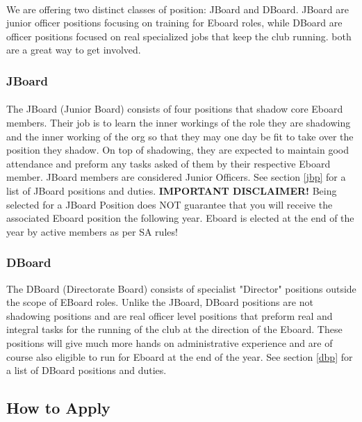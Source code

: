 \documentclass{article}
\begin{document}
\paragraph{}
We are offering two distinct classes of position: JBoard and DBoard. JBoard are junior officer positions focusing on training for Eboard roles, while DBoard are officer positions focused on real specialized jobs that keep the club running. both are a great way to get involved.  
\subsubsection{JBoard}\label{jbd}
\paragraph{}
The JBoard (Junior Board) consists of four positions that shadow core Eboard members. Their job is to learn the inner workings of the role they are shadowing and the inner working of the org so that they may one day be fit to take over the position they shadow. On top of shadowing, they are expected to maintain good attendance and preform any tasks asked of them by their respective Eboard member. JBoard members are considered Junior Officers. See section \ref{jbp} for a list of JBoard positions and duties.
\newline\newline 
\textbf{IMPORTANT DISCLAIMER!} Being selected for a JBoard Position does NOT guarantee that you will receive the associated Eboard position the following year. Eboard is elected at the end of the year by active members as per SA rules!

\subsubsection{DBoard}
The DBoard (Directorate Board) consists of specialist "Director" positions outside the scope of EBoard roles. Unlike the JBoard, DBoard positions are not shadowing positions and are real officer level positions that preform real and integral tasks for the running of the club at the direction of the Eboard. These positions will give much more hands on administrative experience and are of course also eligible to run for Eboard at the end of the year. See section \ref{dbp} for a list of DBoard positions and duties.

\subsection{How to Apply}
\end{document}
